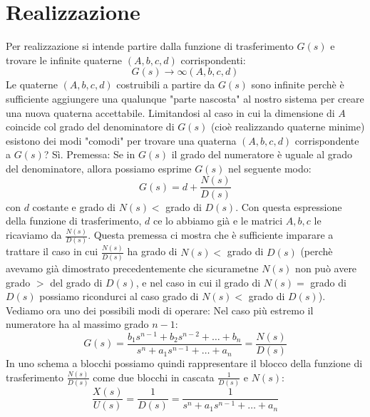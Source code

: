 \section{Realizzazione}
Per realizzazione si intende partire dalla funzione di trasferimento $G(s)$ e trovare le infinite quaterne $(A,b,c,d)$ corrispondenti: 
\[
    G(s) \rightarrow \infty(A,b,c,d)
\]
Le quaterne $(A,b,c,d)$ costruibili a partire da $G(s)$ sono infinite perchè è sufficiente aggiungere una qualunque "parte nascosta" al nostro sistema per creare una nuova quaterna accettabile.\newline
\newline
Limitandosi al caso in cui la dimensione di $A$ coincide col grado del denominatore di $G(s)$ (cioè realizzando quaterne minime) esistono dei modi "comodi" per trovare una quaterna $(A,b,c,d)$ corrispondente a $G(s)$? Sì.\newline
\newline
Premessa: Se in $G(s)$ il grado del numeratore è uguale al grado del denominatore, allora possiamo esprime $G(s)$ nel seguente modo:
\[
    G(s) = d + \frac{N(s)}{D(s)}
\]
con $d$ costante e grado di $N(s) <$ grado di $D(s)$.\newline
Con questa espressione della funzione di trasferimento, $d$ ce lo abbiamo già e le matrici $A,b,c$ le ricaviamo da $\frac{N(s)}{D(s)}$.\newline
\newline
Questa premessa ci mostra che è sufficiente imparare a trattare il caso in cui $\frac{N(s)}{D(s)}$ ha grado di $N(s) <$ grado di $D(s)$ (perchè avevamo già dimostrato precedentemente che sicurametne $N(s)$ non può avere grado $>$ del grado di $D(s)$, e nel caso in cui il grado di $N(s) = $ grado di $D(s)$ possiamo ricondurci al caso grado di $N(s) <$ grado di $D(s)$).\newline
\newline
Vediamo ora uno dei possibili modi di operare:\newline
Nel caso più estremo il numeratore ha al massimo grado $n-1$:
\[
    G(s) = \frac{ b_1 s^{n-1} + b_2 s^{n-2} + \dots + b_n }{ s^n + a_1 s^{n-1} + \dots + a_n } = \frac{N(s)}{D(s)}
\]
In uno schema a blocchi possiamo quindi rappresentare il blocco della funzione di trasferimento $\frac{N(s)}{D(s)}$ come due blocchi in cascata $\frac{1}{D(s)}$ e $N(s)$:\newline
\[
    \frac{X(s)}{U(s)} = \frac{1}{D(s)} = \frac{1}{ s^n + a_1 s^{n-1} + \dots + a_n }
\]
